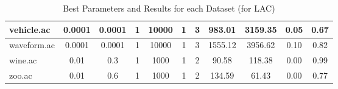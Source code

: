 \begin{table}[htbp]
\begin{tabular}{|l|c|c|c|c|c|c||c|c|c|c|}
		\hline
		vehicle.ac     & 0.0001   & 0.0001      & 1              & 10000               & 1             & 3             & 983.01         & 3159.35        & 0.05           & 0.67           \\
		\hline
		waveform.ac    & 0.0001   & 0.0001      & 1              & 10000               & 1             & 3             & 1555.12        & 3956.62        & 0.10           & 0.82           \\
		\hline
		wine.ac        & 0.01     & 0.3         & 1              & 1000                & 1             & 2             & 90.58          & 118.38         & 0.00           & 0.99           \\
		\hline
		zoo.ac         & 0.01     & 0.6         & 1              & 1000                & 1             & 2             & 134.59         & 61.43          & 0.00           & 0.77           \\
		\hline
		\end{tabular}
	\caption{Best Parameters and Results for each Dataset (for LAC)}
	\label{tab:best_runs_for_each_db_lac_uc}
\end{table}